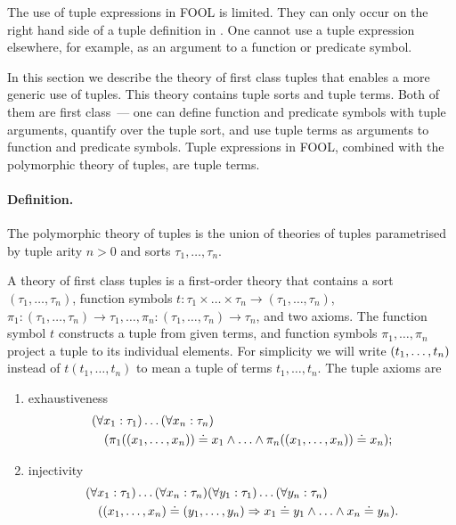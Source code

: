 
The use of tuple expressions in FOOL is limited. They can only occur on the right hand side of a tuple definition in \LETIN. One cannot use a tuple expression elsewhere, for example, as an argument to a function or predicate symbol.

In this section we describe the theory of first class tuples that enables a more generic use of tuples. This theory contains tuple sorts and tuple terms. Both of them are first class~--- one can define function and predicate symbols with tuple arguments, quantify over the tuple sort, and use tuple terms as arguments to function and predicate symbols. Tuple expressions in FOOL, combined with the polymorphic theory of tuples, are tuple terms.

\paragraph*{\bf Definition.}
The polymorphic theory of tuples is the union of theories of tuples parametrised by tuple arity $n > 0$ and sorts $\tau_1,\ldots,\tau_n$.

A theory of first class tuples is a first-order theory that contains a sort $(\tau_1,\ldots,\tau_n)$, function symbols $t:\tau_1\times\ldots\times\tau_n\to(\tau_1,\ldots,\tau_n)$, $\pi_1:(\tau_1,\ldots,\tau_n)\to\tau_1,\ldots,\pi_n:(\tau_1,\ldots,\tau_n)\to\tau_n$, and two axioms. The function symbol $t$ constructs a tuple from given terms, and function symbols $\pi_1,\ldots,\pi_n$ project a tuple to its individual elements. For simplicity we will write $({t_1,\ldots,t_n})$ instead of $t(t_1,\ldots,t_n)$ to mean a tuple of terms $t_1,\ldots,t_n$. The tuple axioms are
\begin{enumerate}
  \item exhaustiveness
        \begin{align*}
          &(\forall x_1:\tau_1)\ldots(\forall x_n:\tau_n)\\
          &\quad(\pi_1(({x_1,\ldots,x_n}))\doteq x_1 \wedge \ldots \wedge \pi_n(({x_1,\ldots,x_n}))\doteq x_n);
        \end{align*}
  \item injectivity
        \begin{align*}
          &(\forall x_1:\tau_1)\ldots(\forall x_n:\tau_n)(\forall y_1:\tau_1)\ldots(\forall y_n:\tau_n)\\
          &\quad(({x_1,\ldots,x_n}) \doteq ({y_1,\ldots,y_n}) \Rightarrow x_1 \doteq y_1 \wedge \ldots \wedge x_n \doteq y_n).
        \end{align*}
\end{enumerate}

